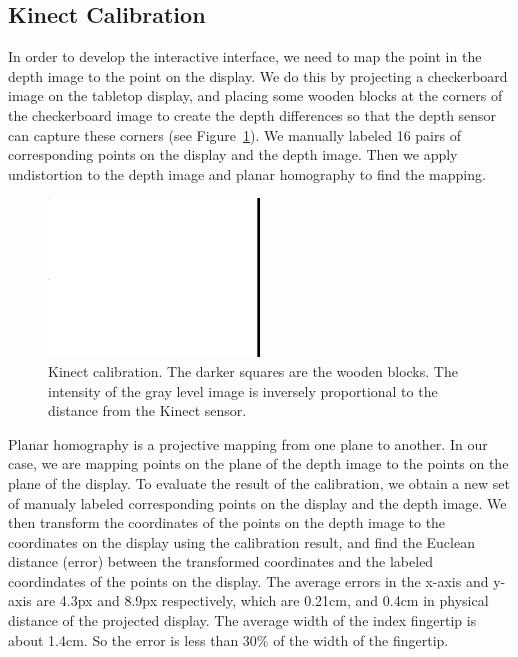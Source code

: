 \subsection{Kinect Calibration}
In order to develop the interactive interface, we need to map the point in the
depth image to the point on the display. We do this by projecting a
checkerboard image on the tabletop display, and placing some wooden blocks at
the corners of the checkerboard image to create the depth differences so that 
the depth sensor can capture these corners (see Figure~\ref{fig:calibration}).
We manually labeled 16 pairs of corresponding points on the display and the depth image. Then we
apply undistortion to the depth image and planar homography to find the mapping.

\begin{figure}[h]
  \centering
  \includegraphics[width=0.5\textwidth]{figures/calibration.png} 
  \caption{Kinect calibration. The darker squares are the wooden blocks. The
  intensity of the gray level image is inversely proportional to the distance
  from the Kinect sensor.}
  \label{fig:calibration}
\end{figure}

Planar homography is a projective mapping from one plane to another. In our
case, we are mapping points on the plane of the depth image to the points
on the plane of the display. To evaluate the result of the calibration, we
obtain a new set of manualy labeled corresponding points on the display and the
depth image. We then transform the coordinates of the points on the depth image
to the coordinates on the display using the calibration result, and find the
Euclean distance (error) between the transformed coordinates and the labeled
coordindates of the points on the display. The average errors in the x-axis and
y-axis are 4.3px and 8.9px respectively, which are 0.21cm, and 0.4cm in physical distance of the
projected display. The average width of the index fingertip is about 1.4cm. So
the error is less than 30\% of the width of the fingertip. 

